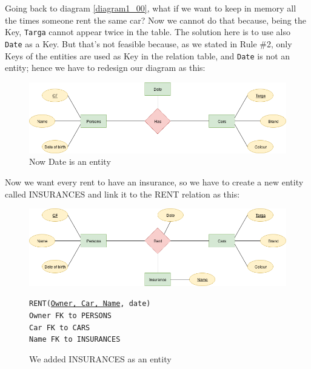 \documentclass[class=book, crop=false, oneside]{standalone}
\newcommand\tab[1][1cm]{\hspace*{#1}}
\begin{document}
Going back to diagram \ref{diagram1_00}, what if we want to keep in memory all the times someone rent the same car?
Now we cannot do that because, being the Key, \texttt{Targa} cannot appear twice in the table.
The solution here is to use also \texttt{Date} as a Key.
But that's not feasible because, as we stated in Rule \#2, only Keys of the entities are used as Key in the relation table, and \texttt{Date} is not an entity; hence we have to redesign our diagram as this:
\begin{figure}[H]
	\includegraphics[width=\textwidth,keepaspectratio]{diagram1_03.png}
	\caption{Now Date is an entity}
	\label{diagram1_03}
\end{figure}
\vskip 20pt

Now we want every rent to have an insurance, so we have to create a new entity called INSURANCES and link it to the RENT relation as this:
\begin{figure}[H]
	\includegraphics[width=\textwidth,keepaspectratio]{diagram1_04.png}
	\caption{We added INSURANCES as an entity}
	\texttt{RENT(\underline{Owner, Car, Name}, date)}\\
		\tab[.8cm] \texttt{Owner FK to PERSONS}\\
		\tab[.8cm] \texttt{Car FK to CARS}\\
		\tab[.8cm] \texttt{Name FK to INSURANCES}
	\label{diagram1_04}
\end{figure}
\vskip 20pt
\end{document}
